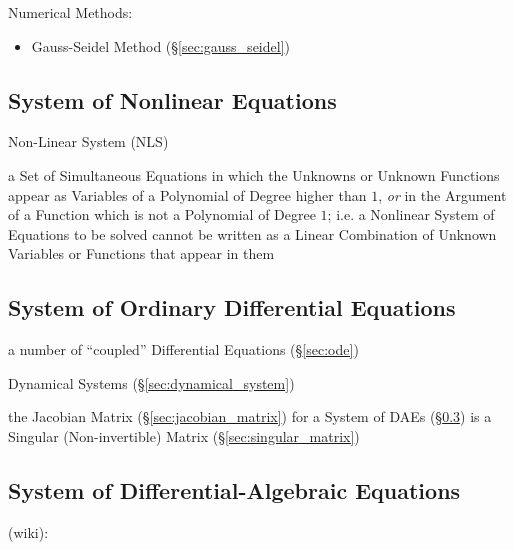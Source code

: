 Numerical Methods:
\begin{itemize}
  \item Gauss-Seidel Method (\S\ref{sec:gauss_seidel})
\end{itemize}



\subsection{System of Nonlinear Equations}
\label{sec:system_of_nonlinear_equations}

Non-Linear System (NLS)

a Set of Simultaneous Equations in which the Unknowns or Unknown Functions
appear as Variables of a Polynomial of Degree higher than $1$, \emph{or} in the
Argument of a Function which is not a Polynomial of Degree $1$; i.e. a
Nonlinear System of Equations to be solved cannot be written as a Linear
Combination of Unknown Variables or Functions that appear in them



\subsection{System of Ordinary Differential Equations}
\label{sec:system_of_odes}

a number of ``coupled'' Differential Equations (\S\ref{sec:ode})

\fist Dynamical Systems (\S\ref{sec:dynamical_system})

\fist the Jacobian Matrix (\S\ref{sec:jacobian_matrix}) for a System of DAEs
(\S\ref{sec:system_of_daes}) is a Singular (Non-invertible) Matrix
(\S\ref{sec:singular_matrix})



\subsection{System of Differential-Algebraic Equations}
\label{sec:system_of_daes}

(wiki):

